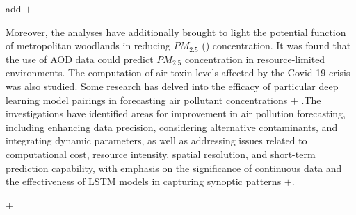 \documentclass[a4paper,fleqn]{cas-sc}
\begin{document}
\par add $+$

Moreover, the analyses have additionally brought to light the potential function of metropolitan woodlands in reducing $PM_{2.5}$ (\cite{kumar2022deep}) concentration. It was found that the use of AOD data could predict $PM_{2.5}$ concentration in resource-limited environments. The computation of air toxin levels affected by the Covid-19 crisis was also studied. Some research has delved into the efficacy of particular deep learning model pairings in forecasting air pollutant concentrations  $+ $ .The investigations have identified areas for improvement in air pollution forecasting, including enhancing data precision, considering alternative contaminants, and integrating dynamic parameters, as well as addressing issues related to computational cost, resource intensity, spatial resolution, and short-term prediction capability, with emphasis on the significance of continuous data and the effectiveness of LSTM models in capturing synoptic patterns $+$.


\par $+$
\end{document}
